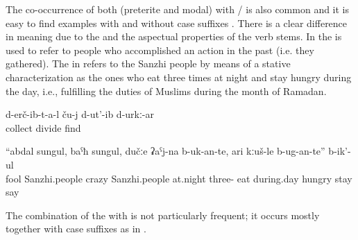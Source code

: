 The co-occurrence of both  (preterite and modal) with \slash{} is also common and it is easy to find examples with  and without case suffixes . There is a clear difference in meaning due to the  and the aspectual properties of the verb stems. In  the  is used to refer to people who accomplished an action in the past (i.e. they gathered). The  in  refers to the Sanzhi people by means of a stative characterization as the ones who eat three times at night and stay hungry during the day, i.e., fulfilling the duties of Muslims during the month of Ramadan.
%
\begin{exe}
	\ex	\label{ex:‎‎‎The ones that gathered (the food) probably divided it among themselves}
	\gll	d-erč-ib-t-a-l	ču-j	d-ut'-ib	d-urkː-ar\\
		collect		divide	find\\
	\glt	{}

	\ex	\label{ex:‎‎Foolish Sanzhi people, crazy Sаnzhi people, at night they eat three times, and during day they stay hungry they said}
	\gll	``abdal	sungul,		baˁħ	sungul,		dučːe		ʡaˁj-na	b-uk-an-te, 					ari 		kːuš-le		b-ug-an-te'' 							b-ik'-ul\\
		fool	Sanzhi.people	crazy	Sanzhi.people	at.night	three-	eat 	during.day	hungry	\tsc{hpl-}stay 	say\\
	\glt	{}
\end{exe}


The combination of the  with  is not particularly frequent; it occurs mostly together with case suffixes as in . 


